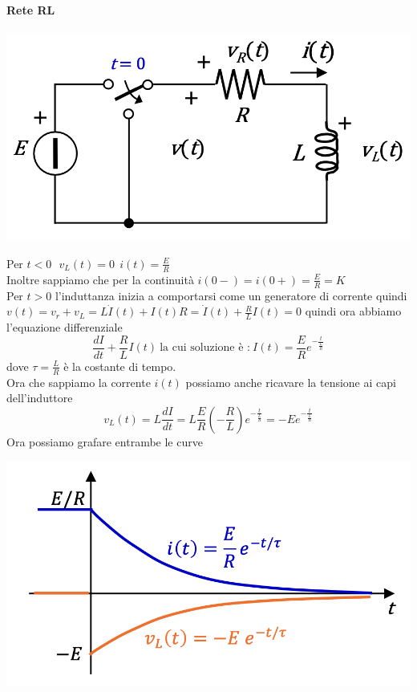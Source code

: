 \documentclass{article}
\theoremstyle{definition}
\begin{document}
\paragraph{Rete RL}
\begin{center}
	\includegraphics[scale=0.35]{immagini/rl}
\end{center}
Per $t<0 \ \ \ v_L(t)=0 \ \ i(t)=\frac{E}{R}$  \\
Inoltre sappiamo che per la continuità $i(0-)=i(0+)=\frac{E}{R}=K$ \\
Per $t>0$ l'induttanza inizia a comportarsi come un generatore di corrente quindi $v(t)=v_r+v_L=L\dot{I}(t)+I(t)R=\dot{I}(t)+\frac{R}{L}I(t)=0$ quindi ora abbiamo l'equazione differenziale $$\frac{dI}{dt}+\frac{R}{L}I(t) \ \text{la cui soluzione è :}\ I(t)=\frac{E}{R}e^{-\frac{t}{\frac{L}{R}}}$$ dove $\tau=\frac{L}{R}$ è la costante di tempo. \\
Ora che sappiamo la corrente $i(t)$ possiamo anche ricavare la tensione ai capi dell'induttore 
$$v_L(t)=L\frac{dI}{dt}=L\frac{E}{R} (-\frac{R}{L})e^{-\frac{t}{\frac{L}{R}}}=-Ee^{-\frac{t}{\frac{L}{R}}}$$
Ora possiamo grafare entrambe le curve 
\begin{center}
	\includegraphics[scale=0.45]{immagini/gl}
\end{center}
\end{document}
